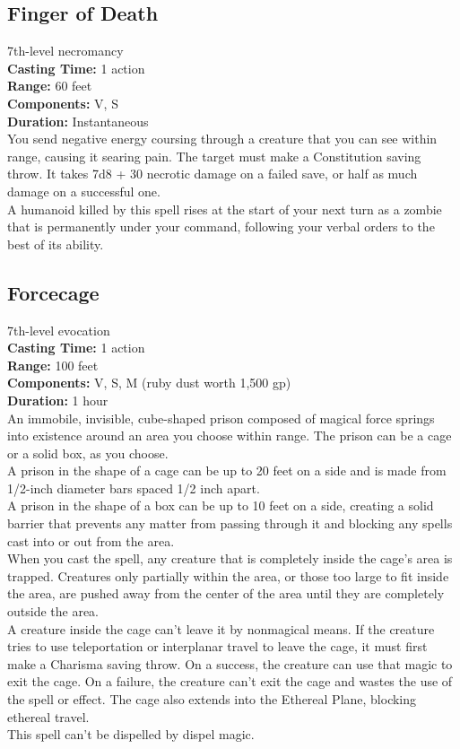 \documentclass[11pt, A4paper, english]{article}
\begin{document}
		\subsection{Finger of Death}
7th-level necromancy \\
\textbf{Casting Time:} 1 action \\
\textbf{Range:} 60 feet \\
\textbf{Components:} V, S \\
\textbf{Duration:} Instantaneous \\
You send negative energy coursing through a creature that you can see within range, causing it searing pain. The target must make a Constitution saving throw. It takes 7d8 + 30 necrotic damage on a failed save, or half as much damage on a successful one. \\
A humanoid killed by this spell rises at the start of your next turn as a zombie that is permanently under your command, following your verbal orders to the best of its ability.

		\subsection{Forcecage}
7th-level evocation \\
\textbf{Casting Time:} 1 action \\
\textbf{Range:} 100 feet \\
\textbf{Components:} V, S, M (ruby dust worth  1,500 gp) \\
\textbf{Duration:} 1 hour \\
An immobile, invisible, cube-shaped prison composed of magical force springs into existence around an area you choose within range. The prison can be a cage or a solid box, as you choose. \\
A prison in the shape of a cage can be up to 20 feet on a side and is made from  1/2-inch diameter bars spaced 1/2 inch apart. \\
A prison in the shape of a box can be up to 10 feet on a side, creating a solid barrier that prevents any matter from passing through it and blocking any spells cast into or out from the area. \\
When you cast the spell, any creature that is completely inside the cage's area is trapped. Creatures only partially within the area, or those too large to fit inside the area, are pushed away from the center of the area until they are completely outside the area. \\
A creature inside the cage can’t leave it by nonmagical means. If the creature tries to use teleportation or interplanar travel to leave the cage, it must first make a Charisma saving throw. On a success, the creature can use that magic to exit the cage. On a failure, the creature can't exit the cage and wastes the use of the spell or effect. The cage also extends into the Ethereal Plane, blocking ethereal travel. \\
This spell can’t be dispelled by dispel magic.
\end{document}
